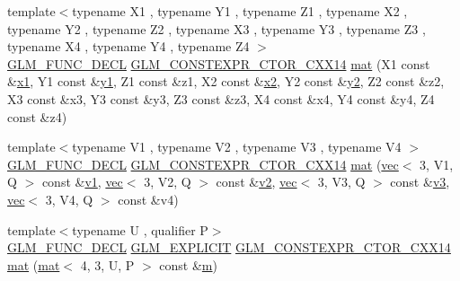 \begin{DoxyCompactItemize}
\item 
{\footnotesize template$<$typename X1 , typename Y1 , typename Z1 , typename X2 , typename Y2 , typename Z2 , typename X3 , typename Y3 , typename Z3 , typename X4 , typename Y4 , typename Z4 $>$ }\\\hyperlink{setup_8hpp_ab2d052de21a70539923e9bcbf6e83a51}{G\+L\+M\+\_\+\+F\+U\+N\+C\+\_\+\+D\+E\+CL} \hyperlink{setup_8hpp_a0900f9145e68bf6061b6f5e7be3fa751}{G\+L\+M\+\_\+\+C\+O\+N\+S\+T\+E\+X\+P\+R\+\_\+\+C\+T\+O\+R\+\_\+\+C\+X\+X14} \hyperlink{structglm_1_1mat_3_014_00_013_00_01_t_00_01_q_01_4_a7ced48f5154c33ac14f3af5771e73446}{mat} (X1 const \&\hyperlink{_s_d_l__opengl__glext_8h_a49825216c96caaeb09237b36651181c5}{x1}, Y1 const \&\hyperlink{_s_d_l__opengl__glext_8h_a3af6c78fcdfccea028a5878bc747ef39}{y1}, Z1 const \&z1, X2 const \&\hyperlink{_s_d_l__opengl__glext_8h_a7b907a03236685c534d89d604cff23c8}{x2}, Y2 const \&\hyperlink{_s_d_l__opengl__glext_8h_a2be1135ed68e8d80fa9e130c7814f8c2}{y2}, Z2 const \&z2, X3 const \&x3, Y3 const \&y3, Z3 const \&z3, X4 const \&x4, Y4 const \&y4, Z4 const \&z4)
\item 
{\footnotesize template$<$typename V1 , typename V2 , typename V3 , typename V4 $>$ }\\\hyperlink{setup_8hpp_ab2d052de21a70539923e9bcbf6e83a51}{G\+L\+M\+\_\+\+F\+U\+N\+C\+\_\+\+D\+E\+CL} \hyperlink{setup_8hpp_a0900f9145e68bf6061b6f5e7be3fa751}{G\+L\+M\+\_\+\+C\+O\+N\+S\+T\+E\+X\+P\+R\+\_\+\+C\+T\+O\+R\+\_\+\+C\+X\+X14} \hyperlink{structglm_1_1mat_3_014_00_013_00_01_t_00_01_q_01_4_a066b9993b2c4aa5d755f83325b1e7870}{mat} (\hyperlink{structglm_1_1vec}{vec}$<$ 3, V1, Q $>$ const \&\hyperlink{_s_d_l__opengl__glext_8h_a435c176a02c061b43e19bdf7c86cceae}{v1}, \hyperlink{structglm_1_1vec}{vec}$<$ 3, V2, Q $>$ const \&\hyperlink{_s_d_l__opengl__glext_8h_a0928f6d0f0f794ba000a21dfae422136}{v2}, \hyperlink{structglm_1_1vec}{vec}$<$ 3, V3, Q $>$ const \&\hyperlink{_s_d_l__opengl__glext_8h_acc806b31cbf466ceba6555983d8b814d}{v3}, \hyperlink{structglm_1_1vec}{vec}$<$ 3, V4, Q $>$ const \&v4)
\item 
{\footnotesize template$<$typename U , qualifier P$>$ }\\\hyperlink{setup_8hpp_ab2d052de21a70539923e9bcbf6e83a51}{G\+L\+M\+\_\+\+F\+U\+N\+C\+\_\+\+D\+E\+CL} \hyperlink{setup_8hpp_a6c74f5a5e7b134ab69023ff9a30d4d5d}{G\+L\+M\+\_\+\+E\+X\+P\+L\+I\+C\+IT} \hyperlink{setup_8hpp_a0900f9145e68bf6061b6f5e7be3fa751}{G\+L\+M\+\_\+\+C\+O\+N\+S\+T\+E\+X\+P\+R\+\_\+\+C\+T\+O\+R\+\_\+\+C\+X\+X14} \hyperlink{structglm_1_1mat_3_014_00_013_00_01_t_00_01_q_01_4_a3531198bc8455e7bcac09cbe197c59fd}{mat} (\hyperlink{structglm_1_1mat}{mat}$<$ 4, 3, U, P $>$ const \&\hyperlink{_s_d_l__opengl__glext_8h_af593500c283bf1a787a6f947f503a5c2}{m})

\end{DoxyCompactItemize}
